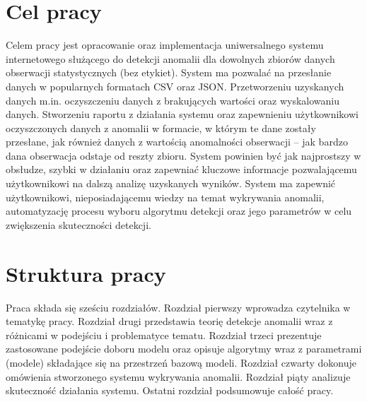 \section{Cel pracy}
Celem pracy jest opracowanie oraz implementacja uniwersalnego systemu internetowego służącego do detekcji anomalii dla dowolnych zbiorów danych obserwacji statystycznych (bez etykiet). System ma pozwalać na przesłanie danych w popularnych formatach CSV oraz JSON. Przetworzeniu uzyskanych danych m.in. oczyszczeniu danych z brakujących wartości oraz wyskalowaniu danych. Stworzeniu raportu z działania systemu oraz zapewnieniu użytkownikowi oczyszczonych danych z anomalii w formacie, w którym te dane zostały przesłane, jak również danych z wartością anomalności obserwacji -- jak bardzo dana obserwacja odstaje od reszty zbioru. System powinien być jak najprostszy w obsłudze, szybki w działaniu oraz zapewniać kluczowe informacje pozwalającemu użytkownikowi na dalszą analizę uzyskanych wyników. 
System ma zapewnić użytkownikowi, nieposiadającemu wiedzy na temat wykrywania anomalii, automatyzację procesu wyboru algorytmu detekcji oraz jego parametrów w celu zwiększenia skuteczności detekcji.

\section{Struktura pracy}

Praca składa się sześciu rozdziałów. Rozdział pierwszy wprowadza czytelnika w tematykę pracy. Rozdział drugi przedstawia teorię detekcje anomalii wraz z różnicami w podejściu i problematyce tematu. Rozdział trzeci prezentuje zastosowane podejście doboru modelu oraz opisuje algorytmy wraz z parametrami (modele) składające się na przestrzeń bazową modeli.  Rozdział czwarty dokonuje omówienia stworzonego systemu wykrywania anomalii. Rozdział piąty analizuje skuteczność działania systemu. Ostatni rozdział podsumowuje całość pracy. 
